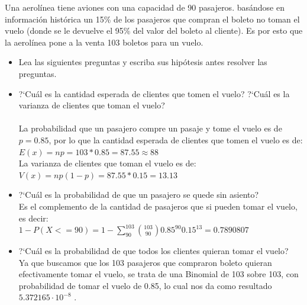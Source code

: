 %
%

Una aerol\'inea tiene aviones con una capacidad de 90 pasajeros. bas\'andose en informaci\'on hist\'orica un
15\% de los pasajeros que compran el boleto no toman el vuelo (donde se le devuelve el 95\% del valor
del boleto al cliente). Es por esto que la aerol\'inea pone a la venta 103 boletos para un vuelo.

\begin{itemize}
	\item Lea las siguientes preguntas y escriba sus hip\'otesis antes resolver las preguntas.\\
	\item ?`Cu\'al es la cantidad esperada de clientes que tomen el vuelo? ?`Cu\'al es la varianza de clientes que toman el vuelo?\\ \\
	La probabilidad que un pasajero compre un pasaje y tome el vuelo es de $p = 0.85$, por lo que la cantidad esperada de clientes que tomen el vuelo es de:\\
	$E(x) = np = 103*0.85 = 87.55 \approx 88$\\
	La varianza de clientes que toman el vuelo es de:\\
	$V(x) = np(1-p) = 87.55*0.15 = 13.13$\\
	\item ?`Cu\'al es la probabilidad de que un pasajero se quede sin asiento?\\
	Es el complemento de la cantidad de pasajeros que si pueden tomar el vuelo, es decir:\\
	$1 - P(X<=90) = 1 - \sum_{90}^{103} { 103 \choose 90} 0.85^{90} 0.15^{13} = 0.7890807$\\
	\item ?`Cu\'al es la probabilidad de que todos los clientes quieran tomar el vuelo?\\
	Ya que buscamos que los 103 pasajeros que compraron boleto quieran efectivamente tomar el vuelo, se trata de una Binomial de 103 sobre 103, con probabilidad de tomar el vuelo de 0.85, lo cual nos da como resultado $ 5.372165 \cdotp 10^{-8}  $ .\\


\end{itemize}
